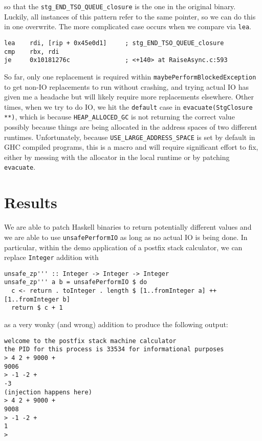 \documentclass[letterpaper]{article}
\begin{document}
so that the \texttt{stg_END_TSO_QUEUE_closure} is the one in the original
binary. Luckily, all instances of this pattern refer to the same pointer, so we
can do this in one overwrite. The more complicated case occurs when we compare
via \texttt{lea}.

\begin{verbatim}
lea    rdi, [rip + 0x45e0d1]     ; stg_END_TSO_QUEUE_closure
cmp    rbx, rdi
je     0x10181276c               ; <+140> at RaiseAsync.c:593
\end{verbatim}

So far, only one replacement is required within
\texttt{maybePerformBlockedException} to get non-IO replacements to run
without crashing, and trying actual IO has given me a headache but will likely
require more replacements elsewhere. Other times, when we try to do IO, we hit
the \texttt{default} case in \texttt{evacuate(StgClosure **)},
which is because \texttt{HEAP_ALLOCED_GC} is not returning the correct
value possibly because things are being allocated in the address spaces of two
different runtimes. Unfortunately, because
\texttt{USE_LARGE_ADDRESS_SPACE} is set by default in GHC compiled
programs, this is a macro and will require significant effort to fix, either by
messing with the allocator in the local runtime or by patching
\texttt{evacuate}.

\section{Results}

We are able to patch Haskell binaries to return potentially different values and
we are able to use \texttt{unsafePerformIO} as long as no actual IO
is being done. In particular, within the demo application of a postfix stack
calculator, we can replace \texttt{Integer} addition with

\begin{verbatim}
unsafe_zp''' :: Integer -> Integer -> Integer
unsafe_zp''' a b = unsafePerformIO $ do
  c <- return . toInteger . length $ [1..fromInteger a] ++ [1..fromInteger b]
  return $ c + 1
\end{verbatim}

as a very wonky (and wrong) addition to produce the following output:

\begin{verbatim}
welcome to the postfix stack machine calculator
the PID for this process is 33534 for informational purposes
> 4 2 + 9000 +
9006
> -1 -2 +
-3
(injection happens here)
> 4 2 + 9000 +
9008
> -1 -2 +
1
>
\end{verbatim}
\end{document}
